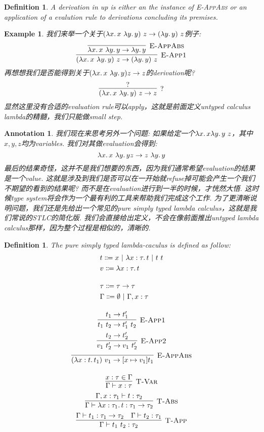 \documentclass{article}
\newtheorem{example}[theorem]{Example}
\newtheorem{definition}[theorem]{Definition}
\newtheorem{annotation}[theorem]{Annotation}
\newcommand{\lam}[2]{\ensuremath{\lambda #1\ldotp #2}} %
\newcommand{\termtype}[2]{\ensuremath{#1:#2}}
\begin{document}
\begin{definition}
\rm A \emph{derivation} in up is either an the instance of \textsc{E-AppAbs} or an application of a evalution rule to derivations concluding its premises. 
\end{definition}

\begin{example}
\rm 我们来举一个关于$(\lam{x}{x}~\lam{y}{y})~z \to (\lam{y}{y})~z$例子:
\[
	\infer[\textsc{E-App1}]{(\lam{x}{x}~\lam{y}{y})~z \to (\lam{y}{y})~z}{\infer[\textsc{E-AppAbs}]{\lam{x}{x}~\lam{y}{y} \to \lam{y}{y}}{}}
\] 
再想想我们是否能得到关于$(\lam{x}{x}~\lam{y}{y}) z \to z$的derivation呢?
\[
	\infer[?]{(\lam{x}{x}~\lam{y}{y})~z \to z}{?}
\]
显然这里没有合适的evaluation rule可以apply，这就是前面定义untyped calculus lambda的精髓，我们只能做small step. 
\end{example}

\begin{annotation}
\rm 我们现在来思考另外一个问题: 如果给定一个$\lam{x}{x \lam{y}{y}}~z$，其中$x,y,z$均为variables. 我们对其做evaluation会得到:
\[
	\lam{x}{x~\lam{y}{y}} z \to z~\lam{y}{y} 
\]
最后的结果奇怪，这并不是我们想要的东西，因为我们通常希望evaluation的结果是一个value. 这就是涉及到我们是否可以在一开始就refuse掉可能会产生一个我们不期望的看到的结果呢? 而不是在evaluation进行到一半的时候，才恍然大悟. 这时候type system将会作为一个最有利的工具来帮助我们完成这个工作. 为了更清晰说明问题，我们还是先给出一个常见的\emph{pure simply typed lambda calculus}，这就是我们常说的STLC的简化版. 我们会直接给出定义，不会在像前面推出untyped lambda calculus那样，因为整个过程是相似的，清晰的.  
\end{annotation}

\begin{definition}
\rm The pure simply typed lambda-caculus is defined as follow:
\[
	\begin{gathered}
	\begin{aligned}
	&t \Coloneqq x ~|~ \lam{\termtype{x}{\tau}}{t} ~|~ t~t \\
	&v \Coloneqq \lam{\termtype{x}{\tau}}{t} \\[1em]
	&\tau \Coloneqq \tau \to \tau \\
	&\Gamma \Coloneqq \emptyset ~|~ \Gamma, \termtype{x}{\tau}
	\end{aligned} \\[1em]
	\infer[\textsc{E-App1}]{t_1~t_2 \to t_1'~t_2}{t_1 \to t_1'} \\
	\infer[\textsc{E-App2}]{v_1~t_2' \to v_1~t_2'}{t_2 \to t_2'} \\
	\infer[\textsc{E-AppAbs}]{(\lam{\termtype{x}{t}}{t_1})~v_1 \to [x \mapsto v_1] t_1}{} \\[1em]
	\infer[\textsc{T-Var}]{\Gamma \vdash \termtype{x}{\tau}}{\termtype{x}{\tau} \in \Gamma} \\
	\infer[\textsc{T-Abs}]{\Gamma \vdash \termtype{\lam{\termtype{x}{\tau_1}}{t}}{\tau_1 \to \tau_2}}{\Gamma, \termtype{x}{\tau_1} \vdash \termtype{t}{\tau_2}} \\
	\infer[\textsc{T-App}]{\Gamma \vdash \termtype{t_1~t_2}{\tau_2}}{\Gamma \vdash \termtype{t_1}{\tau_1 \to \tau_2} & \Gamma \vdash \termtype{t_2}{\tau_1}}
	\end{gathered}
\]
\end{definition}
\end{document}
